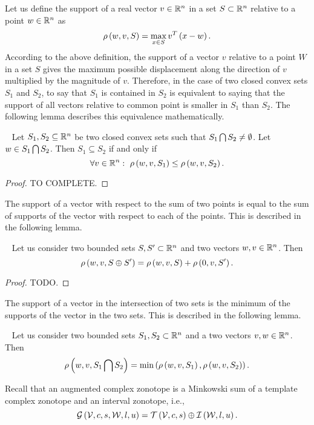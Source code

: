 Let us define the support of a real vector $v\in\mathbb{R}^n$ in a set
$S\subset\mathbb{R}^n$ relative to a point $w\in\mathbb{R}^n$ as
%
\[
\rho\left(w,v,S\right)=\max_{x\in S}v^T\left(x-w\right).
\]
%
According to the above definition, the support of a vector $v$
relative to a point $W$ in a set $S$ gives the maximum possible
displacement along the direction of $v$ multiplied by the magnitude of
$v$.  Therefore, in the case of two closed convex sets $S_1$ and
$S_2$, to say that $S_1$ is contained in $S_2$ is equivalent to saying
that the support of all vectors relative to common point is smaller in
$S_1$ than $S_2$.  The following lemma describes this equivalence
mathematically.
%
\begin{lemma}~\label{lem:support-inclusion}
Let $S_1,S_2\subseteq \mathbb{R}^n$ be two closed convex sets such that
$S_1\bigcap S_2\neq \emptyset$.  Let $w\in S_1\bigcap S_2$.
Then $S_1\subseteq S_2$ if and only if
%
\[
\forall
v\in\mathbb{R}^n:~\rho\left(w,v,S_1\right)\leq \rho\left(w,v,S_2\right).
\]
%
\end{lemma}
%
\begin{proof}
{\color{red} TO COMPLETE}.
\end{proof}
%
The support of a vector with respect to the sum of two points is
equal to the sum of supports of the vector with respect to each of the
points.  This is described in the following lemma.
%
\begin{lemma}~\label{lem:support-minsum}
Let us consider two bounded sets $S,S^\prime\subset\mathbb{R}^n$ and two
vectors $w,v\in\mathbb{R}^n$.  Then
%
\[
\rho\left(w,v,S\oplus S^\prime\right)=\rho\left(w,v,S\right)+\rho\left(0,v,S^\prime\right).
\]
%
\end{lemma}
%
\begin{proof}
  {\color{red} TODO}.
\end{proof}
%
The support of a vector in the intersection of two sets is the minimum
of the supports of the vector in the two sets.  This is described in
the following lemma.
%
\begin{lemma}~\label{lem:support-intersection}
Let us consider two bounded sets $S_1,S_2\subset\mathbb{R}^n$ and a two
vectors $v,w\in\mathbb{R}^n$.  Then
%
\[
\rho\left(w,v,S_1\bigcap S_2\right)=\min\left(\rho\left(w,v,S_1\right),\rho\left(w,v,S_2\right)\right).
\]
%
\end{lemma}
%
Recall that an augmented complex zonotope is a Minkowski sum of a
template complex zonotope and an interval zonotope, i.e.,
%
\[
\mathcal{G}\left(\mathcal{V},c,s,\mathcal{W},l,u\right)=\mathit{\operatorname{\mathcal{T}}}\left(\mathcal{V},c,s\right)\oplus \mathit{\operatorname{\mathcal{I}}}\left(\mathcal{W},l,u\right).
\]
%
